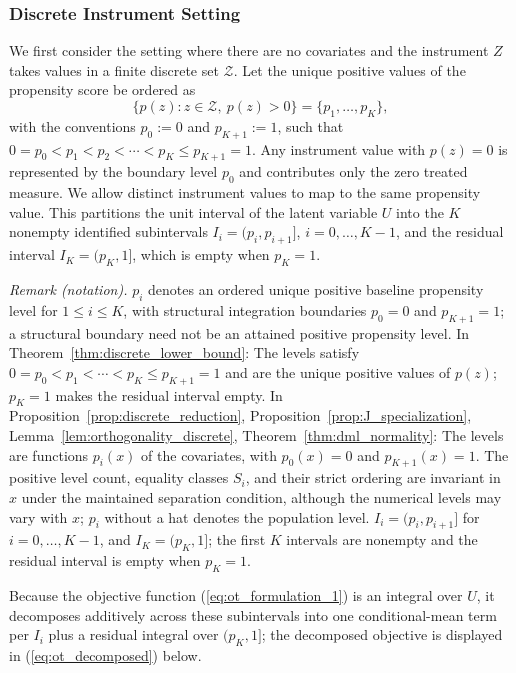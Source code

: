 \subsubsection{Discrete Instrument Setting}\label{subsubsec:discrete_iv}
We first consider the setting where there are no covariates and the instrument $Z$ takes values in a finite discrete set $\mathcal{Z}$. Let the unique positive values of the propensity score be ordered as
\[
    \{p(z) : z \in \mathcal{Z},\ p(z)>0\} = \{p_1, \dots, p_K\},
\]
with the conventions $p_0 := 0$ and $p_{K+1} := 1$, such that $0 = p_0 < p_1 < p_2 < \cdots < p_K \leqslant p_{K+1} = 1$. Any instrument value with $p(z)=0$ is represented by the boundary level $p_0$ and contributes only the zero treated measure. We allow distinct instrument values to map to the same propensity value. This partitions the unit interval of the latent variable $U$ into the $K$ nonempty identified subintervals $I_i=(p_i,p_{i+1}]$, $i=0,\dots,K-1$, and the residual interval $I_K=(p_K,1]$, which is empty when $p_K=1$.

\noindent\textit{Remark (notation).} $p_i$ denotes an ordered unique positive baseline propensity level for $1\leqslant i\leqslant K$, with structural integration boundaries $p_0=0$ and $p_{K+1}=1$; a structural boundary need not be an attained positive propensity level. In Theorem~\ref{thm:discrete_lower_bound}: The levels satisfy $0=p_0<p_1<\cdots<p_K\leqslant p_{K+1}=1$ and are the unique positive values of $p(z)$; $p_K=1$ makes the residual interval empty. In Proposition~\ref{prop:discrete_reduction}, Proposition~\ref{prop:J_specialization}, Lemma~\ref{lem:orthogonality_discrete}, Theorem~\ref{thm:dml_normality}: The levels are functions $p_i(x)$ of the covariates, with $p_0(x)=0$ and $p_{K+1}(x)=1$. The positive level count, equality classes $S_i$, and their strict ordering are invariant in $x$ under the maintained separation condition, although the numerical levels may vary with $x$; $p_i$ without a hat denotes the population level. $I_i=(p_i,p_{i+1}]$ for $i=0,\ldots,K-1$, and $I_K=(p_K,1]$; the first $K$ intervals are nonempty and the residual interval is empty when $p_K=1$.


Because the objective function (\ref{eq:ot_formulation_1}) is an integral over $U$, it decomposes additively across these subintervals into one conditional-mean term per $I_i$ plus a residual integral over $(p_K,1]$; the decomposed objective is displayed in (\ref{eq:ot_decomposed}) below.

